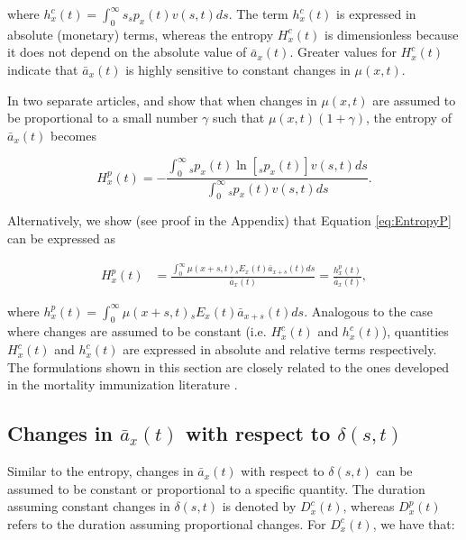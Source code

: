 \documentclass[12pt]{article}
\begin{document}
where ${h}^{c}_{x}(t)=\int_{0}^\infty s {}_sp_x(t) {v}(s,t) ds$. The term ${h}^{c}_{x}(t)$ is expressed in absolute (monetary) terms, whereas the entropy ${H}^{c}_{x}(t)$ is dimensionless because it does not depend on the absolute value of $\bar{a}_x(t)$. Greater values for ${H}^{c}_{x}(t)$ indicate that $\bar{a}_x(t)$ is highly sensitive to constant changes in $\mu(x,t)$.


In two separate articles, \citet{Haberman2011} and \citet{Tsai2013a} show that when changes in $\mu(x,t)$ are assumed to be proportional to a small number $\gamma$ such that $\mu(x,t)(1+\gamma)$, the entropy of $\bar{a}_x(t)$ becomes

\begin{equation} \label{eq:EntropyP}
{H}^{p}_{x}(t) = -\frac{ \int_{0}^{\infty}{}_sp_x(t)\ln[{}_sp_x(t)] {v}(s,t) ds}{\int_0^\infty {}_sp_x(t) {v}(s,t) ds}.
\end{equation}


Alternatively, we show (see proof in the Appendix) that Equation \ref{eq:EntropyP} can be expressed as

\begin{equation} \label{eq:EntropyP2}
\begin{split}
{H}^{p}_{x}(t) &=  \frac{\int_0^\infty \mu(x+s,t)   {}_sE_x(t) \bar{a}_{x+s}(t) ds}{\bar{a}_x(t)} =  \frac{{h}^{p}_{x}(t)}{\bar{a}_x(t)}, 
\end{split}
\end{equation}

where ${h}^{p}_{x}(t)=\int_0^\infty \mu(x+s,t)   {}_sE_x(t) \bar{a}_{x+s}(t) ds$. Analogous to the case where changes are assumed to be constant (i.e. ${H}^{c}_{x}(t)$ and ${h}^{c}_{x}(t)$), quantities ${H}^{c}_{x}(t)$ and ${h}^{c}_{x}(t)$ are expressed in absolute and relative terms respectively. The formulations shown in this section are closely related to the ones developed in the mortality immunization literature \citep{Tsai2013a,Lin2020}.

 
 

\subsection{Changes in $\bar{a}_x(t)$ with respect to $\delta(s,t)$}

 Similar to the entropy, changes in $\bar{a}_x(t)$ with respect to $\delta(s,t)$ can be assumed to be constant or proportional to a specific quantity. The duration assuming constant changes in $\delta(s,t)$ is denoted by ${D}^{c}_{x}(t)$, whereas ${D}^{p}_{x}(t)$ refers to the duration assuming proportional changes. For ${D}^{c}_{x}(t)$, we have that:
\end{document}
